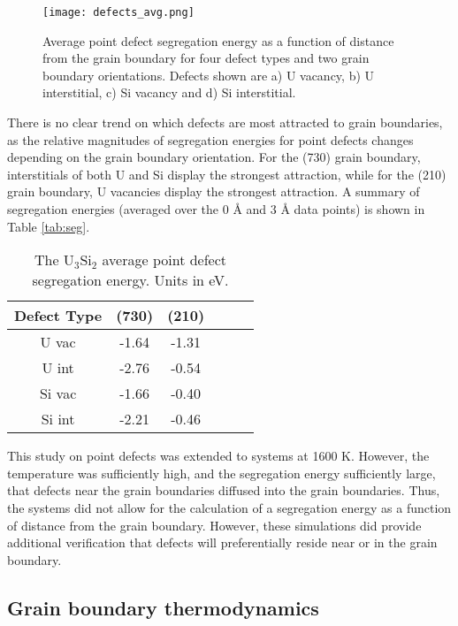 \documentclass[review]{elsarticle}
\begin{document}
\begin{figure}[h]
 \centering
 \texttt{[image: defects\_avg.png]} 
 \caption{Average point defect segregation energy as a function of distance from the grain boundary for four defect types and two grain boundary orientations. Defects shown are a) U vacancy, b) U interstitial, c) Si vacancy and d) Si interstitial.  }
 \label{fig:seg}
\end{figure}

\FloatBarrier

There is no clear trend on which defects are most attracted to grain boundaries, as the relative magnitudes of segregation energies for point defects changes depending on the grain boundary orientation. For the (730) grain boundary, interstitials of both U and Si display the strongest attraction, while for the (210) grain boundary, U vacancies display the strongest attraction. A summary of segregation energies (averaged over the 0 {\AA} and 3 {\AA} data points) is shown in Table \ref{tab:seg}. 

\begin{table}[h]
\caption{The U$_{3}$Si$_{2}$ average point defect segregation energy. Units in eV.} \label{tab:seg}
\begin{center}
\begin{tabular}{|c|c|c|c|c|c|}
	\hline
	Defect Type & (730) & (210)\\
	 \hline
	 U vac & -1.64 & -1.31	  \\
	 U int & -2.76 & -0.54 \\
	 Si vac & -1.66 & -0.40	  \\
	 Si int & -2.21 & -0.46 \\
	 \hline
\end{tabular}
\end{center}
\label{default}
\end{table}

This study on point defects was extended to systems at 1600 K. However, the temperature was sufficiently high, and the segregation energy sufficiently large, that defects near the grain boundaries diffused into the grain boundaries. Thus, the systems did not allow for the calculation of a segregation energy as a function of distance from the grain boundary. However, these simulations did provide additional verification that defects will preferentially reside near or in the grain boundary. 

\FloatBarrier

\subsection{Grain boundary thermodynamics}
\end{document}
